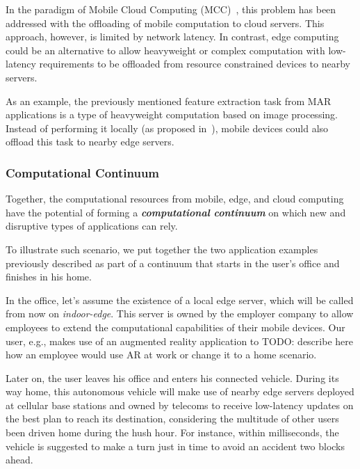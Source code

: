 In the paradigm of Mobile Cloud Computing (MCC)~\cite{}, this problem has been addressed with the offloading of mobile computation to cloud servers. This approach, however, is limited by network latency. In contrast, edge computing could be an alternative to allow heavyweight or complex computation with low-latency requirements to be offloaded from resource constrained devices to nearby servers.


As an example, the previously mentioned feature extraction task from MAR applications is a type of heavyweight computation based on image processing. Instead of performing it locally (as proposed in~\cite{}), mobile devices could also offload this task to nearby edge servers. 

\subsubsection{Computational Continuum}

Together, the computational resources from mobile, edge, and cloud computing have the potential of forming a \textit{\textbf{computational continuum}} on which new and disruptive types of applications can rely. 

To illustrate such scenario, we put together the two application examples previously described as part of a continuum that starts in the user's office and finishes in his home. 

In the office, let's assume the existence of a local edge server, which will be called from now on \textit{indoor-edge}. This server is owned by the employer company to allow employees to extend the computational capabilities of their mobile devices. Our user, e.g., makes use of an augmented reality application to TODO: describe here how an employee would use AR at work or change it to a home scenario.

Later on, the user leaves his office and enters his connected vehicle. During its way home, this autonomous vehicle will make use of nearby edge servers deployed at cellular base stations and owned by telecoms to receive low-latency updates on the best plan to reach its destination, considering the multitude of other users been driven home during the hush hour. For instance, within milliseconds, the vehicle is suggested to make a turn just in time to avoid an accident two blocks ahead. 

